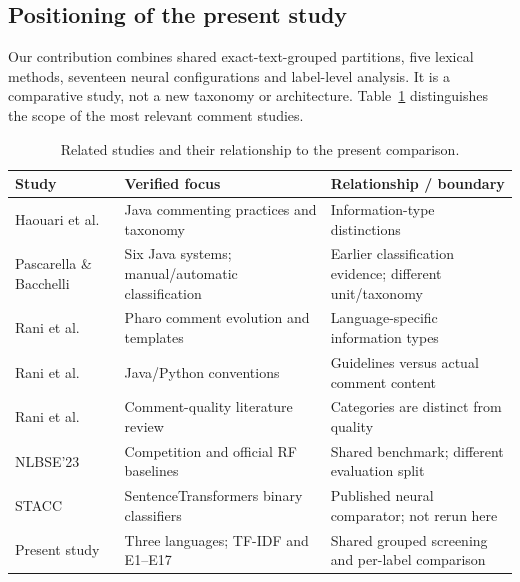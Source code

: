 \subsection{Positioning of the present study}
Our contribution combines shared exact-text-grouped partitions, five lexical methods, seventeen neural configurations and label-level analysis. It is a comparative study, not a new taxonomy or architecture. Table~\ref{tab:related} distinguishes the scope of the most relevant comment studies.
\begin{table}[htbp]\centering\small
\caption{Related studies and their relationship to the present comparison.}\label{tab:related}
\begin{tabularx}{\linewidth}{lXX}\toprule
Study & Verified focus & Relationship / boundary\\\midrule
Haouari et al.~\cite{haouari} & Java commenting practices and taxonomy & Information-type distinctions\\
Pascarella \& Bacchelli~\cite{pascarella} & Six Java systems; manual/automatic classification & Earlier classification evidence; different unit/taxonomy\\
Rani et al.~\cite{rani_pharo} & Pharo comment evolution and templates & Language-specific information types\\
Rani et al.~\cite{rani_conventions} & Java/Python conventions & Guidelines versus actual comment content\\
Rani et al.~\cite{rani_review} & Comment-quality literature review & Categories are distinct from quality\\
NLBSE'23~\cite{nlbse_overview} & Competition and official RF baselines & Shared benchmark; different evaluation split\\
STACC~\cite{stacc} & SentenceTransformers binary classifiers & Published neural comparator; not rerun here\\
Present study & Three languages; TF-IDF and E1--E17 & Shared grouped screening and per-label comparison\\\bottomrule
\end{tabularx}\end{table}
